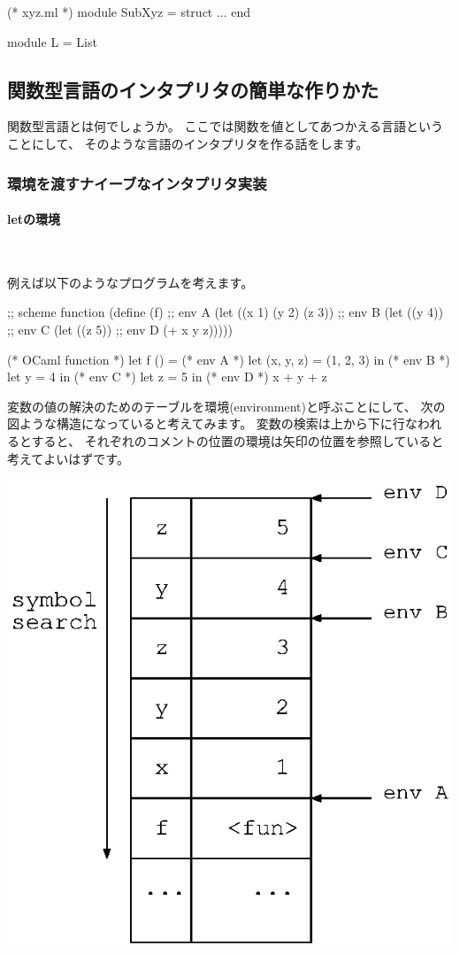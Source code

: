 \documentclass[mingoth,a4paper]{jsarticle}
\begin{document}
\begin{commandline}
(* xyz.ml *)
module SubXyz =
  struct
  ...
  end

module L = List
\end{commandline}


\subsection{関数型言語のインタプリタの簡単な作りかた}

関数型言語とは何でしょうか。
ここでは関数を値としてあつかえる言語ということにして、
そのような言語のインタプリタを作る話をします。

\subsubsection{環境を渡すナイーブなインタプリタ実装}
\label{sec:envmach}

\paragraph{letの環境} \ 

例えば以下のようなプログラムを考えます。

\begin{commandline}
;; scheme function
(define (f)
  ;; env A
  (let ((x 1) (y 2) (z 3))
    ;; env B
    (let ((y 4))
      ;; env C
      (let ((z 5))
	;; env D
	(+ x y z)))))
\end{commandline}

\begin{commandline}
(* OCaml function *)
let f () =
  (* env A *)
  let (x, y, z) = (1, 2, 3) in
    (* env B *)
  let y = 4 in
    (* env C *)
  let z = 5 in
    (* env D *)
    x + y + z
\end{commandline}

変数の値の解決のためのテーブルを環境(environment)と呼ぶことにして、
次の図ような構造になっていると考えてみます。
変数の検索は上から下に行なわれるとすると、
それぞれのコメントの位置の環境は矢印の位置を参照していると考えてよいはずです。

 \includegraphics[height=0.3\hsize]{image201002/caml-env00.eps}\label{fig:env00}
\end{document}

